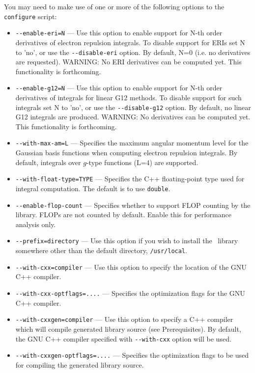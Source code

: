\documentclass[12pt]{article}
\begin{document}
\noindent
You may need to make use of one or more of the following options to
the {\tt configure} script:
\begin{itemize}
\item {\tt -}{\tt -enable-eri=N} --- Use this option to enable support for
  N-th order derivatives of electron repulsion integrals. To
  disable support for ERIs set N to 'no', or use the {\tt -}{\tt -disable-eri} option.
  By default, N=0 (i.e. no derivatives are requested).
  WARNING: No ERI derivatives can be computed yet. This functionality is forthcoming.
\item {\tt -}{\tt -enable-g12=N} --- Use this option to enable support for
  N-th order derivatives of integrals for linear G12 methods. To
  disable support for such integrals set N to 'no', or use the {\tt -}{\tt -disable-g12} option.
  By default, no linear G12 integrals are produced.
  WARNING: No derivatives can be computed yet. This functionality is forthcoming.
\item {\tt -}{\tt -with-max-am=L} --- Specifies the maximum
  angular momentum level for the Gaussian basis functions
  when computing electron repulsion integrals.  By default,
  integrals over $g$-type functions (L=4) are supported.
\item {\tt -}{\tt -with-float-type=TYPE} --- Specifies the C++ floating-point type
  used for integral computation. The default is to use {\tt double}.
\item {\tt -}{\tt -enable-flop-count} --- Specifies whether to support FLOP counting
  by the library. FLOPs are not counted by default. Enable this for performance
  analysis only.
\item {\tt -}{\tt -prefix=directory} --- Use this option if you wish to
  install the \LIBINT\ library somewhere other than the default
  directory, {\tt /usr/local}.
\item {\tt -}{\tt -with-cxx=compiler} --- Use this option to specify the location
  of the GNU C++ compiler.
\item {\tt -}{\tt -with-cxx-optflags=....} --- Specifies the optimization flags for
  the GNU C++ compiler.
\item {\tt -}{\tt -with-cxxgen=compiler} --- Use this option to specify a C++ compiler
  which will compile generated library source (see Prerequisites). By default, the GNU C++
  compiler specified with {\tt -}{\tt -with-cxx} option will be used.
\item {\tt -}{\tt -with-cxxgen-optflags=....} --- Specifies the optimization flags to be
  used for compiling the generated library source. 

\end{itemize}
\end{document}
